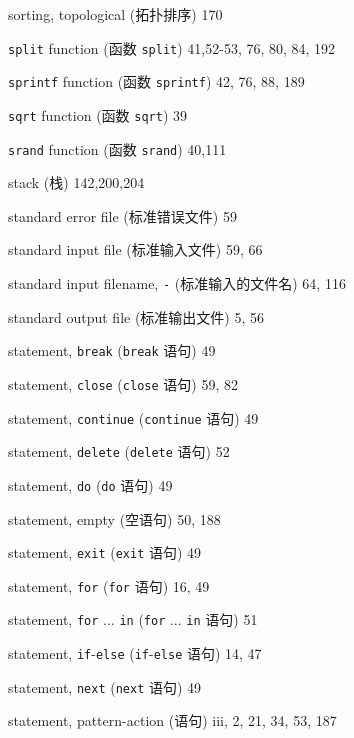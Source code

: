 \begin{multicols}{2}
\hangindent=2pc  sorting, topological (拓扑排序) 170

\hangindent=2pc  \verb'split' function (函数 \verb'split')
41,52-53, 76, 80, 84, 192

\hangindent=2pc  \verb'sprintf' function (函数 \verb'sprintf')
42, 76, 88, 189

\hangindent=2pc  \verb'sqrt' function (函数 \verb'sqrt') 39

\hangindent=2pc  \verb'srand' function (函数 \verb'srand') 40,111

\hangindent=2pc  stack (栈) 142,200,204

\hangindent=2pc  standard error file (标准错误文件) 59

\hangindent=2pc  standard input file (标准输入文件) 59, 66

\hangindent=2pc  standard input filename, \verb'-'
(标准输入的文件名) 64, 116

\hangindent=2pc  standard output file (标准输出文件) 5, 56

\hangindent=2pc  statement, \verb'break' (\verb'break' 语句) 49

\hangindent=2pc  statement, \verb'close' (\verb'close' 语句) 59, 82

\hangindent=2pc  statement, \verb'continue' (\verb'continue'
语句) 49

\hangindent=2pc  statement, \verb'delete' (\verb'delete' 语句) 52

\hangindent=2pc  statement, \verb'do' (\verb'do' 语句) 49

\hangindent=2pc  statement, empty (空语句) 50, 188

\hangindent=2pc  statement, \verb'exit' (\verb'exit' 语句) 49

\hangindent=2pc  statement, \verb'for' (\verb'for' 语句) 16, 49

\hangindent=2pc  statement, \verb'for' ... \verb'in'
(\verb'for' ... \verb'in' 语句) 51

\hangindent=2pc  statement, \verb'if'-\verb'else'
(\verb'if'-\verb'else' 语句) 14, 47

\hangindent=2pc  statement, \verb'next' (\verb'next' 语句) 49

\hangindent=2pc  statement, pattern-action (\patact 语句)
iii, 2, 21, 34, 53, 187


\end{multicols}
